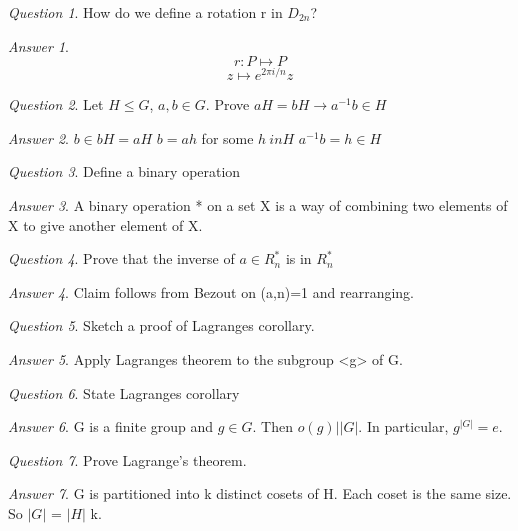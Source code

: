 \documentclass[]{article}
\theoremstyle{remark}
\theoremstyle{qnstyle}
\newtheorem{question}{Question}
\theoremstyle{answerstyle}
\newtheorem*{answer}{Answer}
\begin{document}
{
    \begin{question}
        How do we define a rotation r in $D_{2n}$?
    \end{question}
    \begin{answer}
        $$r: P \mapsto P$$
        $$z \mapsto e^{2\pi i /n} z$$
    \end{answer}
}
{
    \begin{question}
        Let $H \leq G$, $a,b \in G$. Prove
        $aH = bH \rightarrow a^{-1}b \in H$
    \end{question}
    \begin{answer}
        $b \in bH = aH$
        $b = ah$ for some $h \ in H$
        $a^{-1}b = h \in H$
    \end{answer}
}
{
    \begin{question}
        Define a binary operation
    \end{question}
    \begin{answer}
        A binary operation * on a set X is a way of combining two elements of X to give another element of X.
    \end{answer}
}
{
    \begin{question}
        Prove that the inverse of $a \in R^*_n$ is in $R^*_n$
    \end{question}
    \begin{answer}
        Claim follows from Bezout on (a,n)=1 and rearranging.
    \end{answer}
}
{
    \begin{question}
        Sketch a proof of Lagranges corollary.
    \end{question}
    \begin{answer}
        Apply Lagranges theorem to the subgroup <g> of G.
    \end{answer}
}
{
    \begin{question}
        State Lagranges corollary
    \end{question}
    \begin{answer}
        G is a finite group and $g \in G$. Then $o(g) \big \vert \vert G \vert$.
         In particular, $g^{\vert G \vert} = e$.
    \end{answer}
}
{
    \begin{question}
        Prove Lagrange's theorem.
    \end{question}
    \begin{answer}
        G is partitioned into k distinct cosets of H. Each coset is the same size. So $\vert G\vert$ = $\vert H\vert$ k.
    \end{answer}
}
\end{document}
